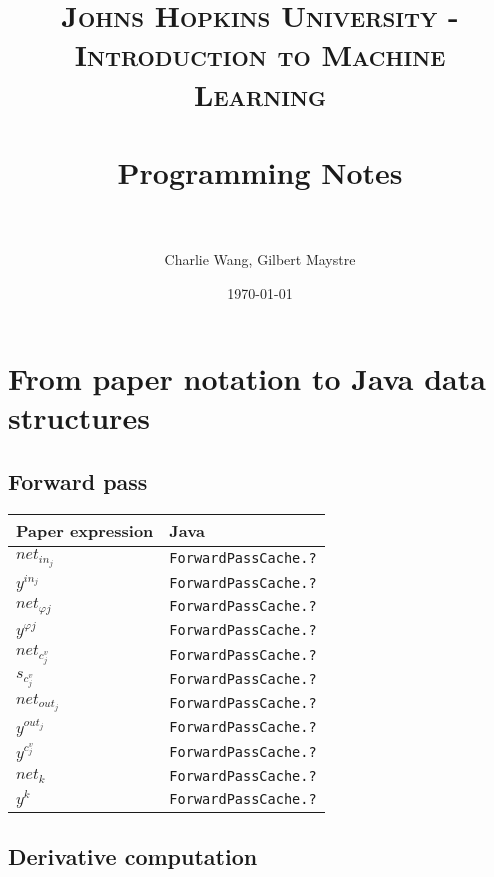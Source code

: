 \documentclass[paper=A4, fontsize=11pt]{scrartcl} %
\title{	
\normalfont \normalsize 
\textsc{Johns Hopkins University - Introduction to Machine Learning} \\ [25pt] %
\horrule{0.5pt} \\[0.4cm] %
\huge Programming Notes \\ %
\horrule{2pt} \\[0.5cm] %
}
\author{Charlie Wang, Gilbert Maystre} %
\date{\normalsize\today} %
\begin{document}
\maketitle %
\newpage

\section{From paper notation to Java data structures}

\subsection{Forward pass}

\begin{center}
\begin{tabular}{|l|l|} 
	\hline
 		Paper expression & Java\\ 
 	\hline
 	\hline
 		$net_{in_j}$ & \verb!ForwardPassCache.?! \\ 
 	\hline
  		$y^{in_j}$ & \verb!ForwardPassCache.?! \\ 
 	\hline
   		$net_{\varphi j}$ & \verb!ForwardPassCache.?! \\ 
 	\hline
   		$y^{\varphi j}$ & \verb!ForwardPassCache.?! \\ 
 	\hline
   		$net_{c_j^v}$ & \verb!ForwardPassCache.?! \\ 
 	\hline
   		$s_{c_j^v}$ & \verb!ForwardPassCache.?! \\ 
 	\hline
   		$net_{out_j}$ & \verb!ForwardPassCache.?! \\ 
 	\hline
   		$y^{out_j}$ & \verb!ForwardPassCache.?! \\ 
 	\hline
   		$y^{c_j^v}$ & \verb!ForwardPassCache.?! \\ 
 	\hline
   		$net_k$ & \verb!ForwardPassCache.?! \\ 
 	\hline
   		$y^k$ & \verb!ForwardPassCache.?! \\ 
 	\hline
\end{tabular}
\end{center}

\subsection{Derivative computation}
\end{document}
